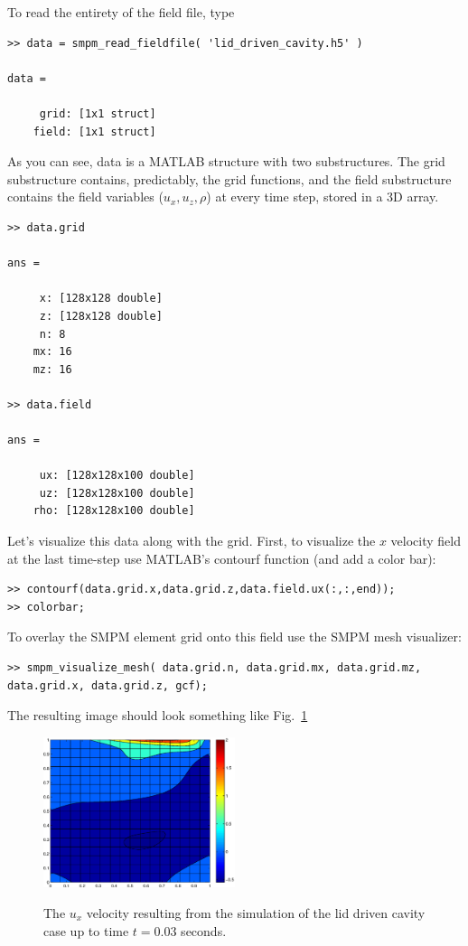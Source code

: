 \documentclass[onside]{article}
\begin{document}
To read the entirety of the field file, type
\begin{verbatim}
>> data = smpm_read_fieldfile( 'lid_driven_cavity.h5' )

data = 

     grid: [1x1 struct]
    field: [1x1 struct]
\end{verbatim}
As you can see, data is a MATLAB structure with two substructures.  The grid substructure contains, predictably, the grid functions, and the field substructure contains the field variables ($u_x,u_z,\rho$) at every time step, stored in a 3D array.

\begin{verbatim}
>> data.grid

ans = 

     x: [128x128 double]
     z: [128x128 double]
     n: 8
    mx: 16
    mz: 16
    
>> data.field

ans = 

     ux: [128x128x100 double]
     uz: [128x128x100 double]
    rho: [128x128x100 double]

\end{verbatim}

Let's visualize this data along with the grid.  First, to visualize the $x$ velocity field at the last time-step use MATLAB's contourf function (and add a color bar):
\begin{verbatim}
>> contourf(data.grid.x,data.grid.z,data.field.ux(:,:,end));
>> colorbar;
\end{verbatim}
To overlay the SMPM element grid onto this field use the SMPM mesh visualizer:
\begin{verbatim}
>> smpm_visualize_mesh( data.grid.n, data.grid.mx, data.grid.mz, data.grid.x, data.grid.z, gcf);	
\end{verbatim}
The resulting image should look something like Fig.~\ref{ldc}
\begin{figure}
	\begin{center}
	\label{ldc}
	\includegraphics[width=0.5\textwidth]{quickstart_lid_driven_cavity_ux.eps}
	\end{center}
	\caption{The $u_x$ velocity resulting from the simulation of the lid driven cavity case up to time $t = 0.03$ seconds.}
\end{figure}
\end{document}
